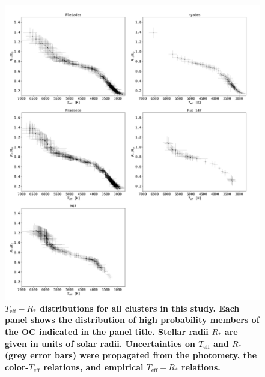 \documentclass{aa}
\begin{document}
   \begin{figure}[ht!]
		\centering
           \includegraphics[width=\hsize]{pics/clusters/teff_R.png}

      \caption{\textbf{$T_\mathrm{eff}-R_*$ distributions for all clusters in this study. Each panel shows the distribution of high probability members of the OC indicated in the panel title. Stellar radii $R_*$ are given in units of solar radii. Uncertainties on $T_\mathrm{eff}$ and $R_*$ (grey error bars) were propagated from the photomety, the color-$T_\mathrm{eff}$ relations, and empirical $T_\mathrm{eff}-R_*$ relations.}}
         \label{fig:teff_radius}
   \end{figure}   

\end{document}
